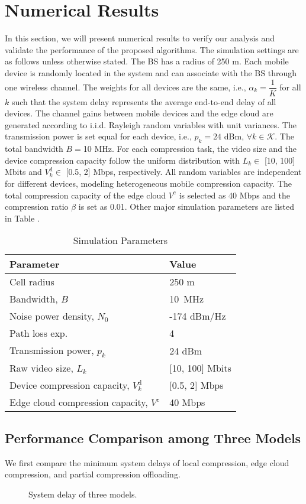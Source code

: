 \documentclass[journal,draftcls,onecolumn,12pt,twoside]{IEEEtran}
\providecommand{\tabularnewline}{\\}
\begin{document}
\section{Numerical Results}
In this section, we will present numerical results to verify our analysis and validate the performance of the proposed algorithms. The simulation settings are as follows unless otherwise stated. The BS has a radius of 250 m. Each mobile device is randomly located in the system and can associate with the BS through one wireless channel. The weights for all devices are the same, i.e., $\alpha_k=\dfrac{1}{K}$ for all $k$ such that the system delay represents the average end-to-end delay of all devices. The channel gains between mobile devices and the edge cloud are generated according to i.i.d. Rayleigh random variables with unit variances. The transmission power is set equal for each device, i.e., $p_k=24$ dBm, $\forall k \in \mathcal{K}$.  The total bandwidth $B=$10 MHz. For each compression task, the video size and the  device compression capacity follow the uniform distribution with $L_k \in$ [10, 100] Mbits and $V_k^{\text{d}}\in$ [0.5, 2]  Mbps, respectively. All random variables are independent for different devices, modeling heterogeneous mobile compression capacity. The total compression capacity of the edge cloud $V^{\text{c}}$ is selected as 40 Mbps and the compression ratio $\beta$ is set as 0.01. Other major simulation parameters are listed in Table \uppercase\expandafter{}.
\begin{table}[!htp]
\caption{Simulation Parameters}
\vspace{-2em}
\centering{}
\begin{tabular}[t]{|l|l|}
    \hline
    Parameter & Value \tabularnewline
    \hline
    \hline
    Cell radius & 250 m\tabularnewline
    \hline
    Bandwidth, $B$ &10~MHz\tabularnewline
    \hline
    Noise power density, $N_0$ &-174 dBm/Hz \tabularnewline
    \hline
    Path loss exp.  & 4\tabularnewline
    \hline
    Transmission power, $p_{k}$  & 24 dBm\tabularnewline
    \hline
    Raw video size, $L_k$  &[10, 100] Mbits \tabularnewline
    \hline
    Device compression capacity, $V_k^{\text{d}}$ & [0.5, 2] Mbps \tabularnewline
    \hline
    Edge cloud compression capacity, $V^{\text{c}}$  &40 Mbps \tabularnewline
    \hline
\end{tabular}
\end{table}

\subsection{Performance Comparison among Three Models}
We first compare the minimum system delays of local compression, edge cloud compression, and partial compression offloading.
\begin{figure}
	\centering
	\caption{System delay of three models.}\label{System_delay}
\end{figure}
\end{document}
